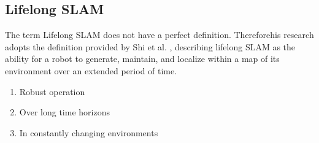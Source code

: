 \subsection{Lifelong SLAM}

The term Lifelong SLAM does not have a perfect definition. Thereforehis research adopts the definition provided by Shi et al. \cite{shiAreWeReady2020}, describing lifelong SLAM as the ability for a robot to generate, maintain, and localize within a map of its environment over an extended period of time. 
\begin{singlespace}
    \begin{enumerate}
        \item Robust operation
        \item Over long time horizons
        \item In constantly changing environments
    \end{enumerate}
\end{singlespace}